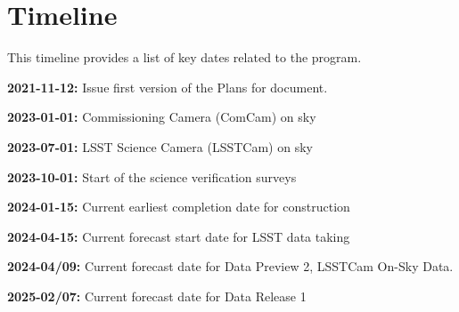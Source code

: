 \section{Timeline} \label{sec:timeline}

This timeline provides a list of key dates  related to the \es program. 

{\bf 2021-11-12:} Issue first version of the \ro Plans for \es document. 

{\bf 2023-01-01:} Commissioning Camera (ComCam) on sky

{\bf 2023-07-01:} LSST Science Camera (LSSTCam) on sky

{\bf 2023-10-01:} Start of the science verification surveys

{\bf 2024-01-15:} Current earliest completion date for construction

{\bf 2024-04-15:} Current forecast start date for LSST data taking

{\bf 2024-04/09:} Current forecast date for Data Preview 2, LSSTCam On-Sky Data.

{\bf 2025-02/07:} Current forecast date for Data Release 1
